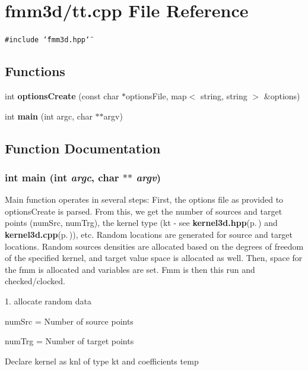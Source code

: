 \section{fmm3d/tt.cpp File Reference}
\label{tt_8cpp}


{\tt \#include \char`\"{}fmm3d.hpp\char`\"{}}\par
\subsection*{Functions}
\begin{CompactItemize}
\item 
int {\bf options\-Create} (const char $\ast$options\-File, map$<$ string, string $>$ \&options)
\item 
int {\bf main} (int argc, char $\ast$$\ast$argv)
\end{CompactItemize}


\subsection{Function Documentation}
\subsubsection{\setlength{\rightskip}{0pt plus 5cm}int main (int {\em argc}, char $\ast$$\ast$ {\em argv})}\label{tt_8cpp_30c4c19ff69d905e8e4c750b3af23485_30c4c19ff69d905e8e4c750b3af23485}


Main function operates in several steps: First, the options file as provided to options\-Create is parsed. From this, we get the number of sources and target points (num\-Src, num\-Trg), the kernel type (kt - see {\bf kernel3d.hpp}{\rm (p.\,\pageref{kernel3d_8hpp})} and {\bf kernel3d.cpp}{\rm (p.\,\pageref{kernel3d_8cpp})}), etc. Random locations are generated for source and target locations. Random sources densities are allocated based on the degrees of freedom of the specified kernel, and target value space is allocated as well. Then, space for the fmm is allocated and variables are set. Fmm is then this run and checked/clocked.

1. allocate random data

num\-Src = Number of source points

num\-Trg = Number of target points

Declare kernel as knl of type kt and coefficients temp

